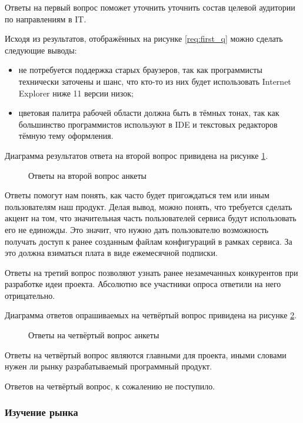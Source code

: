 Ответы на первый вопрос поможет уточнить уточнить состав целевой аудитории по направлениям в IT.

Исходя из результатов, отображённых на рисунке \ref{req:first_q} можно сделать следующие выводы:
\begin{itemize}
    \item не потребуется поддержка старых браузеров, так как программисты технически заточены и шанс, что кто-то из них будет использовать Internet Explorer ниже 11 версии низок;
    \item цветовая палитра рабочей области должна быть в тёмных тонах, так как большинство программистов используют в IDE и текстовых редакторов тёмную тему оформления.
\end{itemize}

Диаграмма результатов ответа на второй вопрос привидена на рисунке \ref{req:second_q}.

\begin{figure}[H]
    \caption{Ответы на второй вопрос анкеты}
    \label{req:second_q}
\end{figure}

Ответы помогут нам понять, как часто будет пригождаться тем или иным пользователям наш продукт. Делая вывод, можно понять, что
требуется сделать акцент на том, что значительная часть пользователей сервиса будут использовать его не единожды. Это значит, что нужно дать пользователю возможность получать доступ к ранее созданным файлам конфигураций в рамках сервиса. За это должна взиматься плата в виде ежемесячной подписки.

Ответы на третий вопрос позволяют узнать ранее незамечанных конкурентов при разработке идеи проекта. Абсолютно все участники опроса ответили на него отрицательно.

Диаграмма ответов опрашиваемых на четвёртый вопрос привидена на рисунке \ref{req:fourth_q}.

\begin{figure}[H]
    \caption{Ответы на четвёртый вопрос анкеты}
    \label{req:fourth_q}
\end{figure}

Ответы на четвёртый вопрос являются главными для проекта, иными словами нужен ли рынку разрабатываемый программный продукт.

Ответов на четвёртый вопрос, к сожалению не поступило.

\subsubsection{Изучение рынка}

